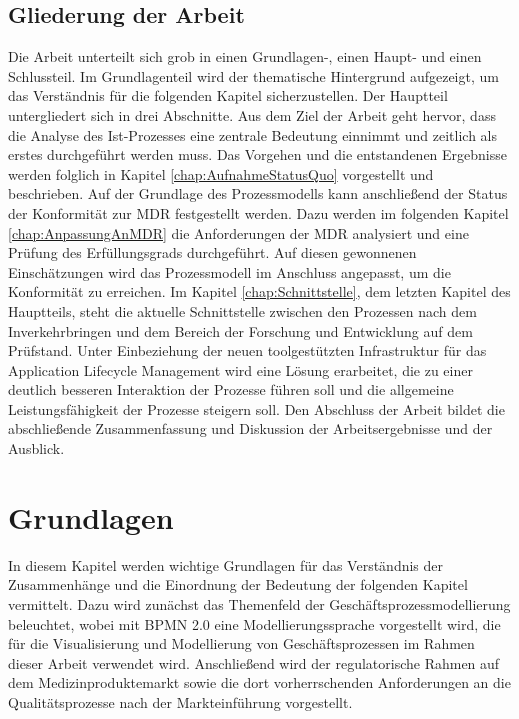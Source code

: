 \documentclass[a4paper,12pt]{report}
\begin{document}
\section{Gliederung der Arbeit}
Die Arbeit unterteilt sich grob in einen Grundlagen-, einen Haupt- und einen Schlussteil. Im Grundlagenteil wird der thematische Hintergrund aufgezeigt, um das Verständnis für die folgenden Kapitel sicherzustellen. Der Hauptteil untergliedert sich in drei Abschnitte. Aus dem Ziel der Arbeit geht hervor, dass die Analyse des Ist-Prozesses eine zentrale Bedeutung einnimmt und zeitlich als erstes durchgeführt werden muss. Das Vorgehen und die entstandenen Ergebnisse werden folglich in Kapitel \ref{chap:AufnahmeStatusQuo} vorgestellt und beschrieben. Auf der Grundlage des Prozessmodells kann anschließend der Status der Konformität zur MDR festgestellt werden. Dazu werden im folgenden Kapitel \ref{chap:AnpassungAnMDR} die Anforderungen der MDR analysiert und eine Prüfung des Erfüllungsgrads durchgeführt. Auf diesen gewonnenen Einschätzungen wird das Prozessmodell im Anschluss angepasst, um die Konformität zu erreichen. Im Kapitel \ref{chap:Schnittstelle}, dem letzten Kapitel des Hauptteils, steht die aktuelle Schnittstelle zwischen den Prozessen nach dem Inverkehrbringen und dem Bereich der Forschung und Entwicklung auf dem Prüfstand. Unter Einbeziehung der neuen toolgestützten Infrastruktur für das Application Lifecycle Management wird eine Lösung erarbeitet, die zu einer deutlich besseren Interaktion der Prozesse führen soll und die allgemeine Leistungsfähigkeit der Prozesse steigern soll. Den Abschluss der Arbeit bildet die abschließende Zusammenfassung und Diskussion der Arbeitsergebnisse und der Ausblick.

\chapter{Grundlagen}\label{chap:Grundlagen}
In diesem Kapitel werden wichtige Grundlagen für das Verständnis der Zusammenhänge und die Einordnung der Bedeutung der folgenden Kapitel vermittelt. Dazu wird zunächst das Themenfeld der Geschäftsprozessmodellierung beleuchtet, wobei mit BPMN 2.0 eine Modellierungssprache vorgestellt wird, die für die Visualisierung und Modellierung von Geschäftsprozessen im Rahmen dieser Arbeit verwendet wird. Anschließend wird der regulatorische Rahmen auf dem Medizinproduktemarkt sowie die dort vorherrschenden Anforderungen an die Qualitätsprozesse nach der Markteinführung vorgestellt.
\end{document}
